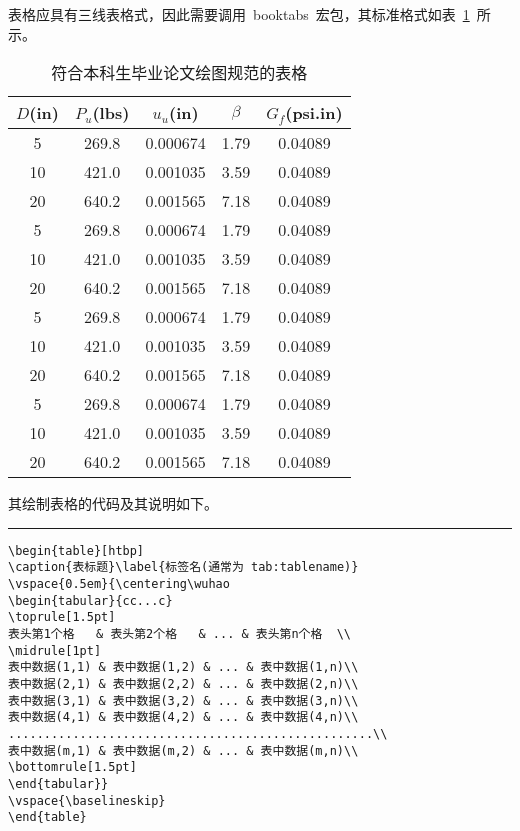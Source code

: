 表格应具有三线表格式，因此需要调用~booktabs~宏包，其标准格式如表~\ref{tab:table1}~所示。
\begin{table}[htbp]
\caption{符合本科生毕业论文绘图规范的表格}\label{tab:table1}
\vspace{0.5em}
\begin{center}
{\wuhao
\begin{tabular}{ccccc}
\toprule[1.5pt]
$D$(in) & $P_u$(lbs) & $u_u$(in) & $\beta$ & $G_f$(psi.in)\\
\midrule[1pt]
 5 & 269.8 & 0.000674 & 1.79 & 0.04089\\
10 & 421.0 & 0.001035 & 3.59 & 0.04089\\
20 & 640.2 & 0.001565 & 7.18 & 0.04089\\
 5 & 269.8 & 0.000674 & 1.79 & 0.04089\\
10 & 421.0 & 0.001035 & 3.59 & 0.04089\\
20 & 640.2 & 0.001565 & 7.18 & 0.04089\\
 5 & 269.8 & 0.000674 & 1.79 & 0.04089\\
10 & 421.0 & 0.001035 & 3.59 & 0.04089\\
20 & 640.2 & 0.001565 & 7.18 & 0.04089\\
 5 & 269.8 & 0.000674 & 1.79 & 0.04089\\
10 & 421.0 & 0.001035 & 3.59 & 0.04089\\
20 & 640.2 & 0.001565 & 7.18 & 0.04089\\
\bottomrule[1.5pt]
\end{tabular}}
\end{center}
\vspace{\baselineskip}
\end{table}

其绘制表格的代码及其说明如下。
\vspace{1em}\noindent\hrule

\begin{verbatim}
\begin{table}[htbp]
\caption{表标题}\label{标签名(通常为 tab:tablename)}
\vspace{0.5em}{\centering\wuhao
\begin{tabular}{cc...c}
\toprule[1.5pt]
表头第1个格   & 表头第2个格   & ... & 表头第n个格  \\
\midrule[1pt]
表中数据(1,1) & 表中数据(1,2) & ... & 表中数据(1,n)\\
表中数据(2,1) & 表中数据(2,2) & ... & 表中数据(2,n)\\
表中数据(3,1) & 表中数据(3,2) & ... & 表中数据(3,n)\\
表中数据(4,1) & 表中数据(4,2) & ... & 表中数据(4,n)\\
...................................................\\
表中数据(m,1) & 表中数据(m,2) & ... & 表中数据(m,n)\\
\bottomrule[1.5pt]
\end{tabular}}
\vspace{\baselineskip}
\end{table}
\end{verbatim}

